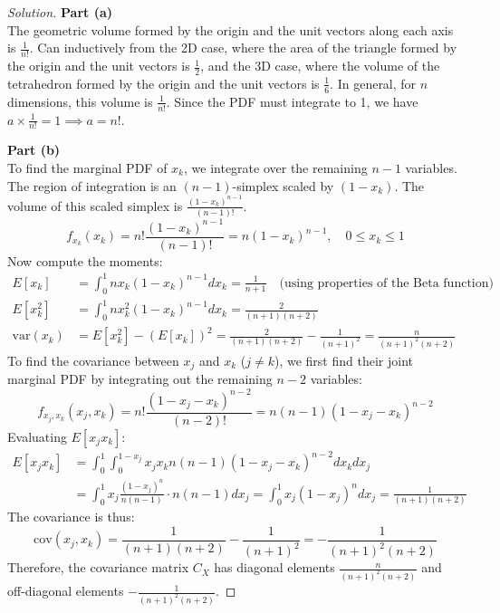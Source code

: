 \documentclass{article}
\begin{document}
\begin{proof}[Solution]
	\textbf{Part (a)}\\
	The geometric volume formed by the origin and the unit vectors along each axis is $\frac{1}{n!}$. Can inductively from the 2D case, where the area of the triangle formed by the origin and the unit vectors is $\frac{1}{2}$, and the 3D case, where the volume of the tetrahedron formed by the origin and the unit vectors is $\frac{1}{6}$. In general, for $n$ dimensions, this volume is $\frac{1}{n!}$.
	Since the PDF must integrate to 1, we have $a \times \frac{1}{n!} = 1 \implies a = n!$.
	
	\textbf{Part (b)}\\
	To find the marginal PDF of $x_k$, we integrate over the remaining $n-1$ variables. The region of integration is an $(n-1)$-simplex scaled by $(1-x_k)$. The volume of this scaled simplex is $\frac{(1-x_k)^{n-1}}{(n-1)!}$.
	\[
		f_{x_k}(x_k) = n! \frac{(1-x_k)^{n-1}}{(n-1)!} = n(1-x_k)^{n-1}, \quad 0 \le x_k \le 1
	\]
	Now compute the moments:
	\begin{align*}
		E[x_k] &= \int_0^1 n x_k (1-x_k)^{n-1} dx_k = \frac{1}{n+1} \quad \text{(using properties of the Beta function)} \\
		E[x_k^2] &= \int_0^1 n x_k^2 (1-x_k)^{n-1} dx_k = \frac{2}{(n+1)(n+2)} \\
		\text{var}(x_k) &= E[x_k^2] - (E[x_k])^2 = \frac{2}{(n+1)(n+2)} - \frac{1}{(n+1)^2} = \frac{n}{(n+1)^2(n+2)}
	\end{align*}
	To find the covariance between $x_j$ and $x_k$ ($j \neq k$), we first find their joint marginal PDF by integrating out the remaining $n-2$ variables:
	\[
		f_{x_j, x_k}(x_j, x_k) = n! \frac{(1-x_j-x_k)^{n-2}}{(n-2)!} = n(n-1)(1-x_j-x_k)^{n-2}
	\]
	Evaluating $E[x_j x_k]$:
	\begin{align*}
		E[x_j x_k] &= \int_0^1 \int_0^{1-x_j} x_j x_k n(n-1)(1-x_j-x_k)^{n-2} dx_k dx_j \\
		&= \int_0^1 x_j \frac{(1-x_j)^n}{n(n-1)} \cdot n(n-1) dx_j = \int_0^1 x_j (1-x_j)^n dx_j = \frac{1}{(n+1)(n+2)}
	\end{align*}
	The covariance is thus:
	\[
		\text{cov}(x_j, x_k) = \frac{1}{(n+1)(n+2)} - \frac{1}{(n+1)^2} = -\frac{1}{(n+1)^2(n+2)}
	\]
	Therefore, the covariance matrix $C_X$ has diagonal elements $\frac{n}{(n+1)^2(n+2)}$ and off-diagonal elements $-\frac{1}{(n+1)^2(n+2)}$.
\end{proof}

\vspace{1cm}
\end{document}
